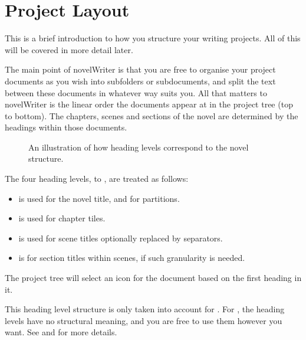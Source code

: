 \documentclass[a4paper,11pt,english]{sphinxmanual}
\begin{document}
\section{Project Layout}
\label{\detokenize{usage_breakdown:project-layout}}\label{\detokenize{usage_breakdown:a-breakdown-project}}
\sphinxAtStartPar
This is a brief introduction to how you structure your writing projects. All of this will be
covered in more detail later.

\sphinxAtStartPar
The main point of novelWriter is that you are free to organise your project documents as you wish
into sub\sphinxhyphen{}folders or sub\sphinxhyphen{}documents, and split the text between these documents in whatever way suits
you. All that matters to novelWriter is the linear order the documents appear at in the project
tree (top to bottom). The chapters, scenes and sections of the novel are determined by the headings
within those documents.

\begin{figure}[htbp]
\centering
\capstart

\noindent{}
\caption{An illustration of how heading levels correspond to the novel structure.}\label{\detokenize{usage_breakdown:id4}}\end{figure}

\sphinxAtStartPar
The four heading levels,  to , are treated as follows:
\begin{itemize}
\item {} 
\sphinxAtStartPar
{} is used for the novel title, and for partitions.

\item {} 
\sphinxAtStartPar
{} is used for chapter tiles.

\item {} 
\sphinxAtStartPar
{} is used for scene titles \textendash{} optionally replaced by separators.

\item {} 
\sphinxAtStartPar
{} is for section titles within scenes, if such granularity is needed.

\end{itemize}

\sphinxAtStartPar
The project tree will select an icon for the document based on the first heading in it.

\sphinxAtStartPar
This heading level structure is only taken into account for {\hyperref[\detokenize{int_glossary:term-Novel-Documents}]{}}. For
{\hyperref[\detokenize{int_glossary:term-Project-Notes}]{}}, the heading levels have no structural meaning, and you are free to use them
however you want. See {\hyperref[\detokenize{project_structure:a-struct}]{}} and {\hyperref[\detokenize{project_references:a-references}]{}} for more details.
\end{document}
